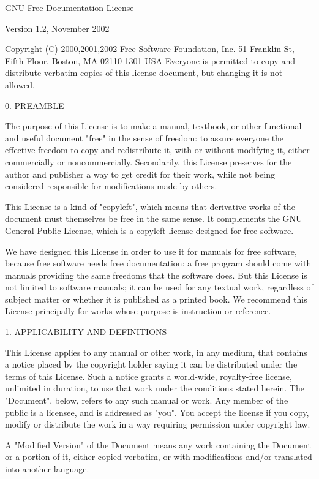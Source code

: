 \documentclass[oneside,english,a4paper,10pt,oneside,openany,final]{memoir}
\begin{document}
\pagebreak{}


GNU Free Documentation License

Version 1.2, November 2002

  Copyright (C) 2000,2001,2002  Free Software Foundation, Inc.
  51 Franklin St, Fifth Floor, Boston, MA  02110-1301  USA
  Everyone is permitted to copy and distribute verbatim copies
  of this license document, but changing it is not allowed.

0. PREAMBLE

The purpose of this License is to make a manual, textbook, or other functional and useful document "free" in the sense of freedom: to assure everyone the effective freedom to copy and redistribute it, with or without modifying it, either commercially or noncommercially. Secondarily, this License preserves for the author and publisher a way to get credit for their work, while not being considered responsible for modifications made by others.

This License is a kind of "copyleft", which means that derivative works of the document must themselves be free in the same sense. It complements the GNU General Public License, which is a copyleft license designed for free software.

We have designed this License in order to use it for manuals for free software, because free software needs free documentation: a free program should come with manuals providing the same freedoms that the software does. But this License is not limited to software manuals; it can be used for any textual work, regardless of subject matter or whether it is published as a printed book. We recommend this License principally for works whose purpose is instruction or reference.

1. APPLICABILITY AND DEFINITIONS

This License applies to any manual or other work, in any medium, that contains a notice placed by the copyright holder saying it can be distributed under the terms of this License. Such a notice grants a world-wide, royalty-free license, unlimited in duration, to use that work under the conditions stated herein. The "Document", below, refers to any such manual or work. Any member of the public is a licensee, and is addressed as "you". You accept the license if you copy, modify or distribute the work in a way requiring permission under copyright law.

A "Modified Version" of the Document means any work containing the Document or a portion of it, either copied verbatim, or with modifications and/or translated into another language.
\end{document}
